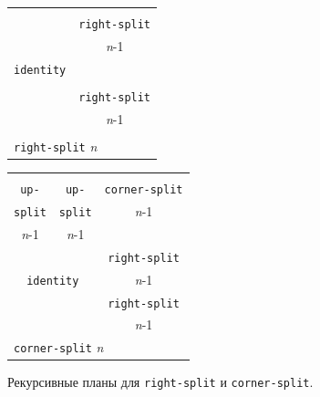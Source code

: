 \begin{cntrfig}
\begin{tabular}{|c|c|}
\hline
                            &  \\
                            &  {\tt right-split} \\
                            &  {\textit n}-1               \\
{\tt identity} &                         \\ \cline{2-2}     
                            & \\
                            &  {\tt right-split}      \\
                            &  {\textit n}-1 \\
                            &  \\                \hline
		
\multicolumn{2}{l}{{\tt right-split} \textit{n}}
\end{tabular}
\hspace{1cm}
\begin{tabular}{|c|c|c|}
\hline
                &             & \\
{\tt up-}        & {\tt up-}    & {\tt corner-split} \\
{\tt split}             & {\tt split}         & {\textit n}-1\\ 
{\textit n}-1                &  {\textit n}-1        &  \\              \hline
\multicolumn{2}{|c|}{}         &{\tt right-split} \\
\multicolumn{2}{|c|}{{\tt identity}} & {\textit n}-1 \\ \cline{3-3} 
\multicolumn{2}{|c|}{}       & {\tt right-split}\\
\multicolumn{2}{|c|}{}       & {\textit n}-1 \\
\hline
\multicolumn{3}{l}{\texttt{corner-split} \textit{n}}
\end{tabular}
\caption{Рекурсивные планы для
{\tt right-split} и {\tt corner-split}.}
\label{P2.13}

\end{cntrfig}


